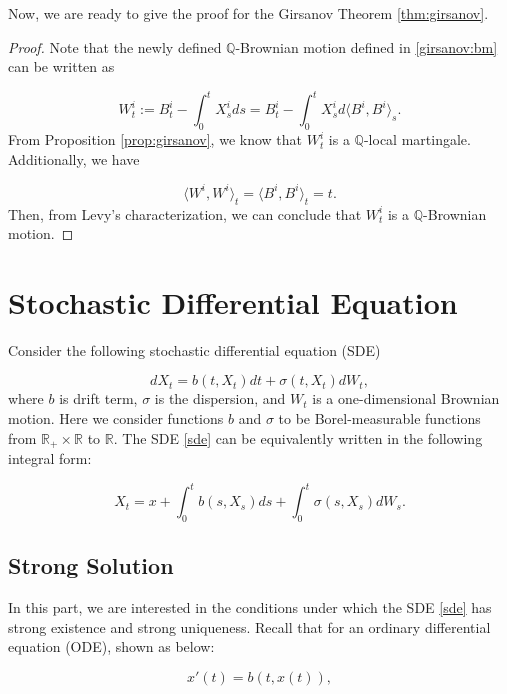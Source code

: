 \documentclass{article}
\begin{document}
Now, we are ready to give the proof for the Girsanov Theorem \ref{thm:girsanov}.

\begin{proof}
Note that the newly defined $\mathbb{Q}$-Brownian motion defined in \eqref{girsanov:bm} can be written as

\begin{equation*} 
W_t^i:=B_t^i-\int^t_0X_s^ids=B_t^i-\int^t_0X_s^id\langle B^i,B^i\rangle_s.
\end{equation*}
From Proposition \ref{prop:girsanov}, we know that $W_t^i$ is a $\mathbb{Q}$-local martingale. Additionally, we have

\begin{equation*}
\langle W^i,W^i\rangle_t=\langle B^i,B^i\rangle_t=t.
\end{equation*}
Then, from Levy's characterization, we can conclude that $W^i_t$ is a $\mathbb{Q}$-Brownian motion.
\end{proof}

\section{Stochastic Differential Equation}

Consider the following stochastic differential equation (SDE)

\begin{equation} \label{sde}
dX_t = b(t,X_t)dt + \sigma(t,X_t)dW_t,
\end{equation}
where $b$ is drift term, $\sigma$ is the dispersion, and $W_t$ is a one-dimensional Brownian motion. Here we consider functions $b$ and $\sigma$ to be Borel-measurable functions from $\mathbb{R}_+\times\mathbb{R}$ to $\mathbb{R}$. The SDE \eqref{sde} can be equivalently written in the following integral form:

\begin{equation*}
X_t = x + \int_0^t b(s,X_s)ds + \int^t_0 \sigma(s,X_s)dW_s.
\end{equation*}

\subsection{Strong Solution}
In this part, we are interested in the conditions under which the SDE \eqref{sde} has strong existence and strong uniqueness. Recall that for an ordinary differential equation (ODE), shown as below:

\begin{equation} \label{ode}
x'(t) = b(t,x(t)),
\end{equation}
\end{document}
